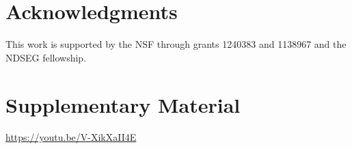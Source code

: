 \documentclass[letterpaper, 10 pt, conference]{ieeeconf}
\begin{document}












\section*{Acknowledgments}
This work is supported by the NSF through grants 1240383 and 1138967 and the NDSEG fellowship.

\section*{Supplementary Material}
\url{https://youtu.be/V-XikXaII4E}



%


\end{document}
